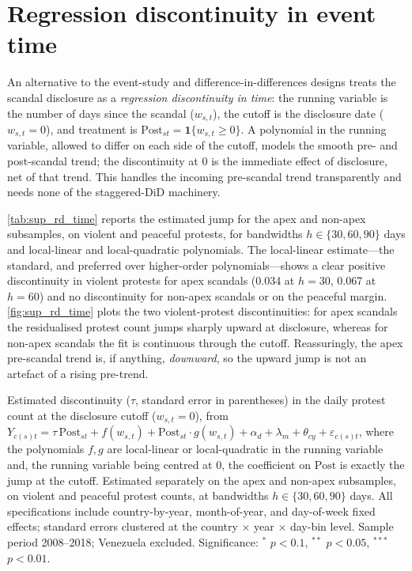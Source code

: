 \documentclass[11pt]{article}
\begin{document}
\clearpage
\section{Regression discontinuity in event time}\label{sup:rd}

An alternative to the event-study and difference-in-differences designs treats the scandal disclosure as a \emph{regression discontinuity in time}: the running variable is the number of days since the scandal ($w_{s,t}$), the cutoff is the disclosure date ($w_{s,t}=0$), and treatment is $\text{Post}_{st}=\mathbf{1}\{w_{s,t}\ge 0\}$. A polynomial in the running variable, allowed to differ on each side of the cutoff, models the smooth pre- and post-scandal trend; the discontinuity at $0$ is the immediate effect of disclosure, net of that trend. This handles the incoming pre-scandal trend transparently and needs none of the staggered-DiD machinery.

\autoref{tab:sup_rd_time} reports the estimated jump for the apex and non-apex subsamples, on violent and peaceful protests, for bandwidths $h\in\{30,60,90\}$ days and local-linear and local-quadratic polynomials. The local-linear estimate---the standard, and preferred over higher-order polynomials---shows a clear positive discontinuity in violent protests for apex scandals (0.034 at $h=30$, 0.067 at $h=60$) and no discontinuity for non-apex scandals or on the peaceful margin. \autoref{fig:sup_rd_time} plots the two violent-protest discontinuities: for apex scandals the residualised protest count jumps sharply upward at disclosure, whereas for non-apex scandals the fit is continuous through the cutoff. Reassuringly, the apex pre-scandal trend is, if anything, \emph{downward}, so the upward jump is not an artefact of a rising pre-trend.

\begin{table}[htb!]
    \caption{Regression discontinuity in event time: jump at disclosure.}
    \label{tab:sup_rd_time}
    \begin{center}
        \scriptsize{}
    \end{center}
    \footnotesize{Estimated discontinuity ($\tau$, standard error in parentheses) in the daily protest count at the disclosure cutoff ($w_{s,t}=0$), from $Y_{c(s)t} = \tau\,\text{Post}_{st} + f(w_{s,t}) + \text{Post}_{st}\cdot g(w_{s,t}) + \alpha_d + \lambda_m + \theta_{cy} + \varepsilon_{c(s)t}$, where the polynomials $f,g$ are local-linear or local-quadratic in the running variable and, the running variable being centred at $0$, the coefficient on $\text{Post}$ is exactly the jump at the cutoff. Estimated separately on the apex and non-apex subsamples, on violent and peaceful protest counts, at bandwidths $h\in\{30,60,90\}$ days. All specifications include country-by-year, month-of-year, and day-of-week fixed effects; standard errors clustered at the country $\times$ year $\times$ day-bin level. Sample period 2008--2018; Venezuela excluded. Significance: $^{*}$ $p<0.1$, $^{**}$ $p<0.05$, $^{***}$ $p<0.01$.}
\end{table}
\end{document}
